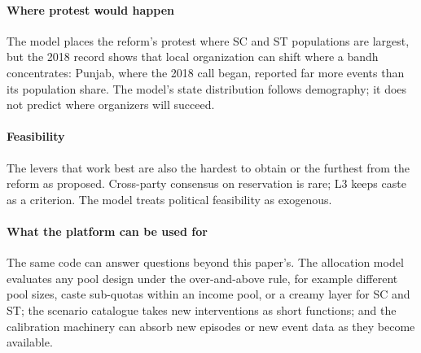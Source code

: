 \documentclass[11pt,a4paper]{article}
\begin{document}
\paragraph{Where protest would happen} The model places the reform's protest where SC and ST populations are largest, but the 2018 record shows that local organization can shift where a bandh concentrates: Punjab, where the 2018 call began, reported far more events than its population share. The model's state distribution follows demography; it does not predict where organizers will succeed.

\paragraph{Feasibility} The levers that work best are also the hardest to obtain or the furthest from the reform as proposed. Cross-party consensus on reservation is rare; L3 keeps caste as a criterion. The model treats political feasibility as exogenous.

\paragraph{What the platform can be used for} The same code can answer questions beyond this paper's. The allocation model evaluates any pool design under the over-and-above rule, for example different pool sizes, caste sub-quotas within an income pool, or a creamy layer for SC and ST; the scenario catalogue takes new interventions as short functions; and the calibration machinery can absorb new episodes or new event data as they become available.
\end{document}
